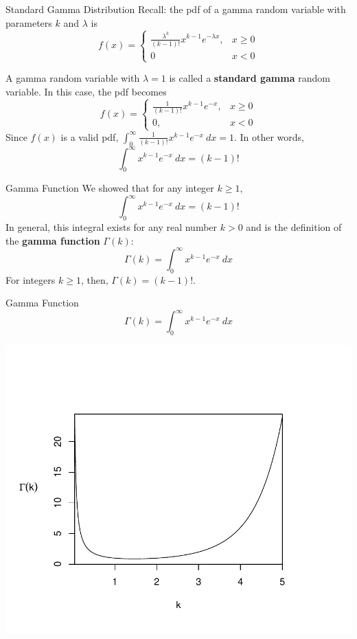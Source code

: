 \documentclass[handout]{beamer}
\renewcommand{\emph}{\textbf}
\begin{document}
\begin{frame}{Standard Gamma Distribution}
Recall: the pdf of a gamma random variable with parameters $k$ and $\lambda$ is
$$f(x) =\begin{cases} \frac{\lambda^k}{(k-1)!}x^{k-1}e^{-\lambda x}, & x\geq 0 \\ 0 & x<0\end{cases}$$

\pause A gamma random variable with $\lambda=1$ is called a \emph{standard gamma} random variable. In this case, the pdf becomes
$$f(x) = \begin{cases}\frac1{(k-1)!}x^{k-1}e^{-x}, & x\geq 0 \\ 0, & x<0\end{cases}$$
\pause Since $f(x)$ is a valid pdf, $\int_0^\infty \frac1{(k-1)!}x^{k-1}e^{-x}\ dx = 1$. In other words,
$$\int_0^\infty x^{k-1}e^{-x}\ dx=(k-1)!$$
\end{frame}

\begin{frame}{Gamma Function}
We showed that for any integer $k\geq 1$, 
$$\int_0^\infty x^{k-1}e^{-x}\ dx=(k-1)!$$
\pause In general, this integral exists for any real number $k>0$ and is the definition of the \emph{gamma function} $\Gamma(k)$:
$$\Gamma(k) = \int_0^\infty x^{k-1}e^{-x}\ dx$$
\pause For integers $k\geq 1$, then, $\Gamma(k)=(k-1)!$.
\end{frame}

\begin{frame}{Gamma Function}
$$\Gamma(k) = \int_0^\infty x^{k-1}e^{-x}\ dx$$
\begin{center}
\vspace{-1.5cm}
\includegraphics[scale=.7]{ch4_gamfun.pdf}
\end{center}
\end{frame}
\end{document}
